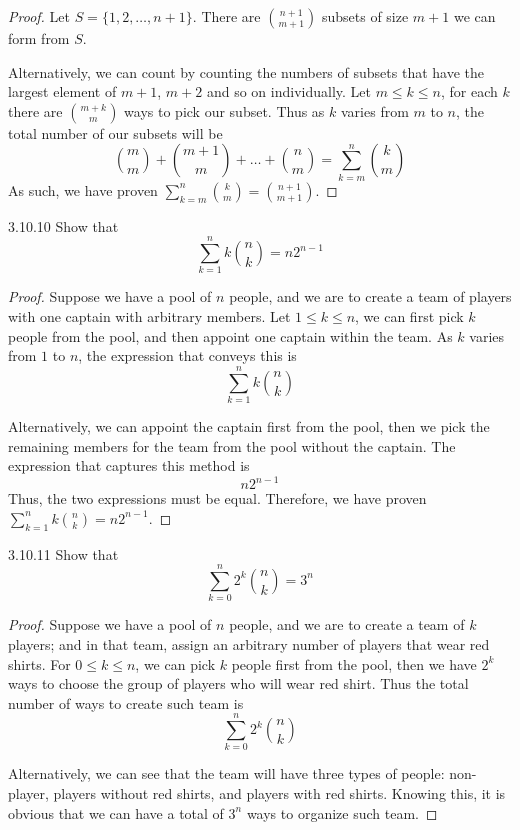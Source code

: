\documentclass{exam}
\begin{document}
\begin{proof}
    Let $S=\{1, 2, \dots, n+1\}$. There are $\binom{n+1}{m+1}$ subsets of size $m+1$ we can form from $S$.

    Alternatively, we can count by counting the numbers of subsets that have the largest element of $m+1$, $m+2$ and so on individually. Let $m \le k \le n$, for each $k$ there are $\binom{m+k}{m}$ ways to pick our subset. Thus as $k$ varies from $m$ to $n$, the total number of our subsets will be \[
    \binom{m}{m} + \binom{m+1}{m} + \dots + \binom{n}{m} = \sum_{k=m}^n \binom{k}{m}
    \]
    As such, we have proven $\sum_{k=m}^n \binom{k}{m} = \binom{n+1}{m+1}$.
\end{proof}

\begin{problem}{3.10.10}
    Show that $$\sum_{k=1}^n k\binom{n}{k}=n2^{n-1}$$
\end{problem}

\begin{proof}
    Suppose we have a pool of $n$ people, and we are to create a team of players with one captain with arbitrary members. Let $1\le k \le n$, we can first pick $k$ people from the pool, and then appoint one captain within the team. As $k$ varies from $1$ to $n$, the expression that conveys this is \[
    \sum_{k=1}^n k\binom n k
    \]

    Alternatively, we can appoint the captain first from the pool, then we pick the remaining members for the team from the pool without the captain. The expression that captures this method is \[
    n2^{n-1}
    \]
    Thus, the two expressions must be equal. Therefore, we have proven $\sum_{k=1}^n k\binom{n}{k}=n2^{n-1}$.
\end{proof}

\begin{problem}{3.10.11}
    Show that $$\sum_{k=0}^n 2^k\binom n k=3^n$$
\end{problem}

\begin{proof}
    Suppose we have a pool of $n$ people, and we are to create a team of $k$ players; and in that team, assign an arbitrary number of players that wear red shirts. For $0 \le k \le n$, we can pick $k$ people first from the pool, then we have $2^k$ ways to choose the group of players who will wear red shirt. Thus the total number of ways to create such team is \[
    \sum_{k=0}^n 2^k\binom n k
    \]

    Alternatively, we can see that the team will have three types of people: non-player, players without red shirts, and players with red shirts. Knowing this, it is obvious that we can have a total of $3^n$ ways to organize such team.
\end{proof}
\end{document}
